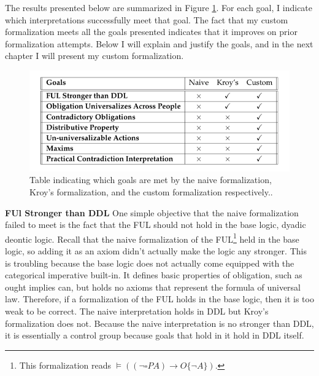 \begin{isabellebody}
\begin{isamarkuptext}
The results presented below are summarized in Figure \ref{fig:goalstable}. For each goal, I indicate which 
interpretations successfully meet that goal. The fact that my custom formalization meets all the goals
presented indicates that it improves on prior formalization attempts. Below I will explain and justify
the goals, and in the next chapter I will present my custom formalization.%
\end{isamarkuptext}\isamarkuptrue%
%
\begin{figure}
\centering
\includegraphics[scale=0.4]{goalstable.png}
\caption{Table indicating which goals are met by the naive formalization, Kroy's formalization, and 
the custom formalization respectively..} \label{fig:goalstable}
\end{figure}
%
\isadelimdocument
%
\endisadelimdocument
%
\isatagdocument
%
\isamarkuptrue%
%
\endisatagdocument
{\isafolddocument}%
%
\isadelimdocument
%
\endisadelimdocument
%
\begin{isamarkuptext}%
\textbf{FUl Stronger than DDL} One simple objective that the naive formalization failed to meet is the fact that the FUL should
not hold in the base logic, dyadic deontic logic. Recall that the naive formalization of the FUL\footnote{
This formalization reads $\vDash ((\neg \square P A) \longrightarrow O \{\neg A\})$.} held in the 
base logic, so adding it as an axiom didn't actually make the logic any stronger. This is troubling 
because the base logic does not actually come equipped with the categorical imperative built-in. It 
defines basic properties of obligation, such as ought implies can, but holds no axioms that represent
the formula of universal law. Therefore, if a formalization of the FUL holds in the 
base logic, then it is too weak to be correct. The naive interpretation holds in DDL but Kroy's formalization
does not. Because the naive interpretation is no stronger than DDL, it is essentially a control group
because goals that hold in it hold in DDL itself.


\end{isamarkuptext}
\end{isabellebody}
